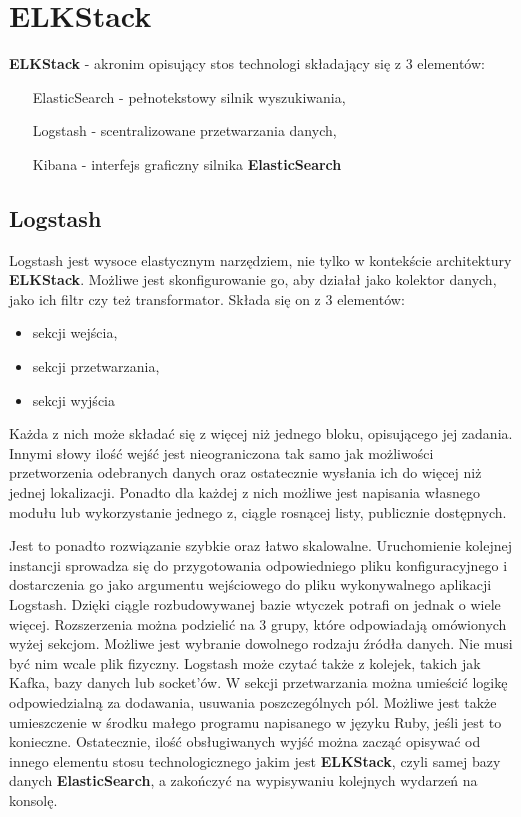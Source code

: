 \section{ELKStack}
\label{chapter:application:elkstack}

\textbf{ELKStack} - akronim opisujący stos technologi składający się z 3 elementów:
\begin{itemize}
    \item[ElasticSearch] - pełnotekstowy silnik wyszukiwania,
    \item[Logstash] - scentralizowane przetwarzania danych,
    \item[Kibana] - interfejs graficzny silnika \textbf{ElasticSearch}
\end{itemize}

\subsection{Logstash}
    Logstash jest wysoce elastycznym narzędziem, nie tylko w kontekście architektury \textbf{ELKStack}.
    Możliwe jest skonfigurowanie go, aby działał jako kolektor danych, jako ich filtr czy też
    transformator. Składa się on z 3 elementów:
    \begin{itemize}
        \item sekcji wejścia,
        \item sekcji przetwarzania,
        \item sekcji wyjścia
    \end{itemize}
    Każda z nich może składać się z więcej niż jednego bloku, opisującego jej zadania.
    Innymi słowy ilość wejść jest nieograniczona tak samo jak możliwości przetworzenia
    odebranych danych oraz ostatecznie wysłania ich do więcej niż jednej lokalizacji.
    Ponadto dla każdej z nich możliwe jest napisania własnego modułu lub wykorzystanie
    jednego z, ciągle rosnącej listy, publicznie dostępnych.
    
    Jest to ponadto rozwiązanie szybkie oraz łatwo skalowalne. Uruchomienie kolejnej
    instancji sprowadza się do przygotowania odpowiedniego pliku konfiguracyjnego
    i dostarczenia go jako argumentu wejściowego do pliku wykonywalnego aplikacji Logstash.
    Dzięki ciągle rozbudowywanej bazie wtyczek potrafi on jednak o wiele więcej. 
    Rozszerzenia można podzielić na 3 grupy, które odpowiadają omówionych wyżej sekcjom.
    Możliwe jest wybranie dowolnego rodzaju źródła danych. Nie musi być nim wcale plik fizyczny.
    Logstash może czytać także z kolejek, takich jak Kafka, bazy danych lub socket'ów.
    W sekcji przetwarzania można umieścić logikę odpowiedzialną za dodawania, usuwania poszczególnych
    pól. Możliwe jest także umieszczenie w środku małego programu napisanego w języku Ruby, jeśli
    jest to konieczne. Ostatecznie, ilość obsługiwanych wyjść można zacząć opisywać od innego
    elementu stosu technologicznego jakim jest \textbf{ELKStack}, czyli samej bazy danych
    \textbf{ElasticSearch}, a zakończyć na wypisywaniu kolejnych wydarzeń na konsolę. 

